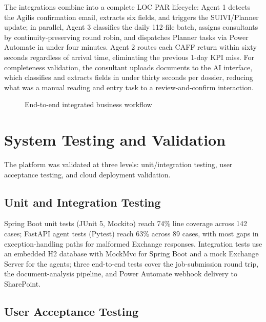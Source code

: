 The integrations combine into a complete LOC PAR lifecycle: Agent 1 detects the Agilis confirmation email, extracts six fields, and triggers the SUIVI/Planner update; in parallel, Agent 3 classifies the daily 112-file batch, assigns consultants by continuity-preserving round robin, and dispatches Planner tasks via Power Automate in under four minutes. Agent 2 routes each CAFF return within sixty seconds regardless of arrival time, eliminating the previous 1-day KPI miss. For completeness validation, the consultant uploads documents to the AI interface, which classifies and extracts fields in under thirty seconds per dossier, reducing what was a manual reading and entry task to a review-and-confirm interaction.

\begin{figure}[H]
  \centering
  \caption{End-to-end integrated business workflow}
  \label{fig:e2e-workflow}
\end{figure}

\section{System Testing and Validation}

The platform was validated at three levels: unit/integration testing, user acceptance testing, and cloud deployment validation.

\subsection{Unit and Integration Testing}

Spring Boot unit tests (JUnit 5, Mockito) reach 74\% line coverage across 142 cases; FastAPI agent tests (Pytest) reach 63\% across 89 cases, with most gaps in exception-handling paths for malformed Exchange responses. Integration tests use an embedded H2 database with MockMvc for Spring Boot and a mock Exchange Server for the agents; three end-to-end tests cover the job-submission round trip, the document-analysis pipeline, and Power Automate webhook delivery to SharePoint.

\subsection{User Acceptance Testing}

